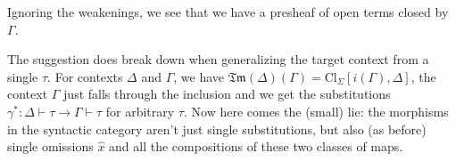 \documentclass[11pt]{article}
\begin{document}
Ignoring the weakenings, we see that we have a presheaf of open terms closed by
\(\Gamma\).

The suggestion does break down when generalizing the target context from a
single \(\tau\). For contexts \(\Delta\) and \(\Gamma\), we have
\(\mathfrak{Tm}(\Delta)(\Gamma) = \text{Cl}_{\Sigma} [i(\Gamma), \Delta]\), the
context \(\Gamma\) just falls through the inclusion and we get the
substitutions \(\gamma^{*} : \Delta \vdash \tau \rightarrow \Gamma \vdash \tau\) for arbitrary \(\tau\). Now here comes the (small) lie: the morphisms in
the syntactic category aren't just single substitutions, but also (as before)
single omissions \(\hat{x}\) and all the compositions of these two classes of
maps.
\end{document}
